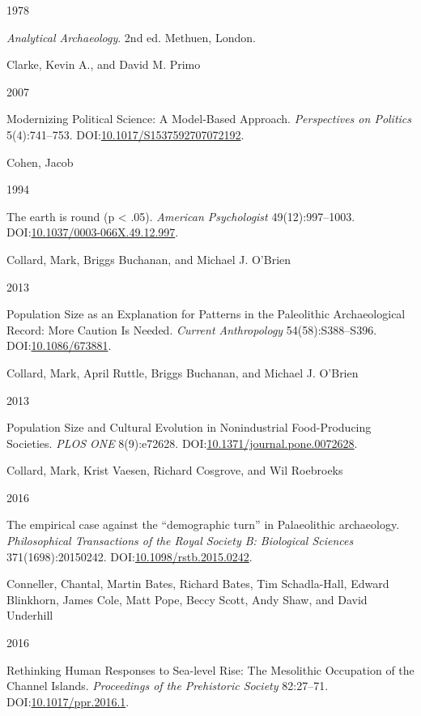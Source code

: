 \documentclass[
  12pt,
  a4paper,
  oneside]{book}
\newlength{\cslhangindent}
\newlength{\csllabelwidth}
\newlength{\cslentryspacingunit} %
\newenvironment{CSLReferences}[2] %
 {%
  \setlength{\parindent}{0pt}
  \ifodd #1
  \let\oldpar\par
  \def\par{\hangindent=\cslhangindent\oldpar}
  \fi
  \setlength{\parskip}{#2\cslentryspacingunit}
 }%
 {}
\newcommand{\CSLBlock}[1]{#1\hfill\break}
\newcommand{\CSLLeftMargin}[1]{\parbox[t]{\csllabelwidth}{#1}}
\newcommand{\CSLRightInline}[1]{\parbox[t]{\linewidth - \csllabelwidth}{#1}\break}
\begin{document}
\begin{CSLReferences}{0}{0}
\leavevmode{}%
\CSLLeftMargin{ 1978 }%
\CSLRightInline{\emph{{Analytical Archaeology}}. 2nd ed. Methuen, London.}

\leavevmode{}%
\CSLBlock{Clarke, Kevin A., and David M. Primo}
\CSLLeftMargin{ 2007}%
\CSLRightInline{{Modernizing Political Science: A Model-Based Approach}. \emph{Perspectives on Politics} 5(4):741--753. DOI:\href{https://doi.org/10.1017/S1537592707072192}{10.1017/S1537592707072192}.}

\leavevmode{}%
\CSLBlock{Cohen, Jacob}
\CSLLeftMargin{ 1994}%
\CSLRightInline{{The earth is round (p \textless{} .05)}. \emph{American Psychologist} 49(12):997--1003. DOI:\href{https://doi.org/10.1037/0003-066X.49.12.997}{10.1037/0003-066X.49.12.997}.}

\leavevmode{}%
\CSLBlock{Collard, Mark, Briggs Buchanan, and Michael J. O'Brien}
\CSLLeftMargin{ 2013}%
\CSLRightInline{{Population Size as an Explanation for Patterns in the Paleolithic Archaeological Record: More Caution Is Needed}. \emph{Current Anthropology} 54(58):S388--S396. DOI:\href{https://doi.org/10.1086/673881}{10.1086/673881}.}

\leavevmode{}%
\CSLBlock{Collard, Mark, April Ruttle, Briggs Buchanan, and Michael J. O'Brien}
\CSLLeftMargin{ 2013}%
\CSLRightInline{{Population Size and Cultural Evolution in Nonindustrial Food-Producing Societies}. \emph{PLOS ONE} 8(9):e72628. DOI:\href{https://doi.org/10.1371/journal.pone.0072628}{10.1371/journal.pone.0072628}.}

\leavevmode{}%
\CSLBlock{Collard, Mark, Krist Vaesen, Richard Cosgrove, and Wil Roebroeks}
\CSLLeftMargin{ 2016}%
\CSLRightInline{{The empirical case against the {``demographic turn''} in Palaeolithic archaeology}. \emph{Philosophical Transactions of the Royal Society B: Biological Sciences} 371(1698):20150242. DOI:\href{https://doi.org/10.1098/rstb.2015.0242}{10.1098/rstb.2015.0242}.}

\leavevmode{}%
\CSLBlock{Conneller, Chantal, Martin Bates, Richard Bates, Tim Schadla-Hall, Edward Blinkhorn, James Cole, Matt Pope, Beccy Scott, Andy Shaw, and David Underhill}
\CSLLeftMargin{ 2016}%
\CSLRightInline{{Rethinking Human Responses to Sea-level Rise: The Mesolithic Occupation of the Channel Islands}. \emph{Proceedings of the Prehistoric Society} 82:27--71. DOI:\href{https://doi.org/10.1017/ppr.2016.1}{10.1017/ppr.2016.1}.}


\end{CSLReferences}
\end{document}
